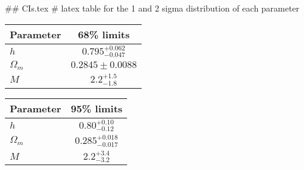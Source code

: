 ## CIs.tex
# latex table for the 1 and 2 sigma distribution of each parameter

\begin{tabular} { l  c}
 Parameter &  68\% limits\\
\hline
{\boldmath$h              $} & $0.795^{+0.062}_{-0.047}   $\\
{\boldmath$\Omega_m       $} & $0.2845\pm 0.0088          $\\
{\boldmath$M              $} & $2.2^{+1.5}_{-1.8}         $\\
\hline
\end{tabular}

\begin{tabular} { l  c}
 Parameter &  95\% limits\\
\hline
{\boldmath$h              $} & $0.80^{+0.10}_{-0.12}      $\\
{\boldmath$\Omega_m       $} & $0.285^{+0.018}_{-0.017}   $\\
{\boldmath$M              $} & $2.2^{+3.4}_{-3.2}         $\\
\hline
\end{tabular}
